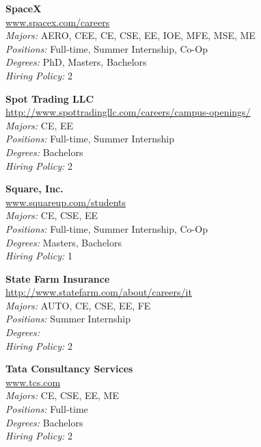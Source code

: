 \documentclass[twoside]{article}
\begin{document}
\begin{center}
\begin{multicols}{3}
\begin{minipage}{.9\columnwidth}{\Large\bf SpaceX }\\
	\url{www.spacex.com/careers}\\
	\emph{Majors:} AERO, CEE, CE, CSE, EE, IOE, MFE, MSE, ME\\
	\emph{Positions:} Full-time, Summer Internship, Co-Op\\
	\emph{Degrees:} PhD, Masters, Bachelors\\
	\emph{Hiring Policy:} 2\\
\end{minipage}
 
\begin{minipage}{.9\columnwidth}{\Large\bf Spot Trading LLC }\\
	\url{http://www.spottradingllc.com/careers/campus-openings/}\\
	\emph{Majors:} CE, EE\\
	\emph{Positions:} Full-time, Summer Internship\\
	\emph{Degrees:} Bachelors\\
	\emph{Hiring Policy:} 2\\
\end{minipage}
 
\begin{minipage}{.9\columnwidth}{\Large\bf Square, Inc. }\\
	\url{www.squareup.com/students}\\
	\emph{Majors:} CE, CSE, EE\\
	\emph{Positions:} Full-time, Summer Internship, Co-Op\\
	\emph{Degrees:} Masters, Bachelors\\
	\emph{Hiring Policy:} 1\\
\end{minipage}
 
\begin{minipage}{.9\columnwidth}{\Large\bf State Farm Insurance }\\
	\url{http://www.statefarm.com/about/careers/it}\\
	\emph{Majors:} AUTO, CE, CSE, EE, FE\\
	\emph{Positions:} Summer Internship\\
	\emph{Degrees:} \\
	\emph{Hiring Policy:} 2\\
\end{minipage}
 
\begin{minipage}{.9\columnwidth}{\Large\bf Tata Consultancy Services }\\
	\url{www.tcs.com}\\
	\emph{Majors:} CE, CSE, EE, ME\\
	\emph{Positions:} Full-time\\
	\emph{Degrees:} Bachelors\\
	\emph{Hiring Policy:} 2\\
\end{minipage}
 

\end{multicols}
\end{center}
\end{document}
